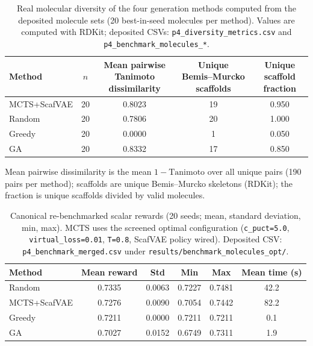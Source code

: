 \documentclass[10pt,a4paper]{article}
\begin{document}
\begin{table}[htbp]
  \centering
  \caption{Real molecular diversity of the four generation methods computed
  from the deposited molecule sets (\num{20} best-in-seed molecules per
  method). Values are computed with RDKit; deposited CSVs:
  \texttt{p4\_diversity\_metrics.csv} and \texttt{p4\_benchmark\_molecules\_*}.}
  \label{tab:sm_diversity}
  \small
  \begin{tabular}{lcccc}
    \toprule
    Method & $n$ & \shortstack{Mean pairwise\\ Tanimoto dissimilarity} & \shortstack{Unique\\ Bemis--Murcko scaffolds} & \shortstack{Unique scaffold\\ fraction} \\
    \midrule
    MCTS+ScafVAE & 20 & \num{0.8023} & \num{19} & \num{0.950} \\
    Random & 20 & \num{0.7806} & \num{20} & \num{1.000} \\
    Greedy & 20 & \num{0.0000} & \num{1} & \num{0.050} \\
    GA & 20 & \num{0.8332} & \num{17} & \num{0.850} \\
    \bottomrule
  \end{tabular}
  \smallskip
  \raggedright\footnotesize Mean pairwise dissimilarity is the mean
  $1-\text{Tanimoto}$ over all unique pairs (\num{190} pairs per method);
  scaffolds are unique Bemis--Murcko skeletons (RDKit); the fraction is
  unique scaffolds divided by valid molecules.
\end{table}

\begin{table}[htbp]
  \centering
  \caption{Canonical re-benchmarked scalar rewards (\num{20} seeds; mean,
  standard deviation, min, max). MCTS uses the screened optimal
  configuration (\texttt{c\_puct=5.0}, \texttt{virtual\_loss=0.01},
  \texttt{T=0.8}, ScafVAE policy wired). Deposited CSV:
  \texttt{p4\_benchmark\_merged.csv} under
  \texttt{results/benchmark\_molecules\_opt/}.}
  \label{tab:sm_benchmark}
  \begin{tabular}{lccccc}
    \toprule
    Method & Mean reward & Std & Min & Max & Mean time (s) \\
    \midrule
    Random & \num{0.7335} & \num{0.0063} & \num{0.7227} & \num{0.7481} & \num{42.2} \\
    MCTS+ScafVAE & \num{0.7276} & \num{0.0090} & \num{0.7054} & \num{0.7442} & \num{82.2} \\
    Greedy & \num{0.7211} & \num{0.0000} & \num{0.7211} & \num{0.7211} & \num{0.1} \\
    GA & \num{0.7027} & \num{0.0152} & \num{0.6749} & \num{0.7311} & \num{1.9} \\
    \bottomrule
  \end{tabular}
\end{table}
\end{document}
